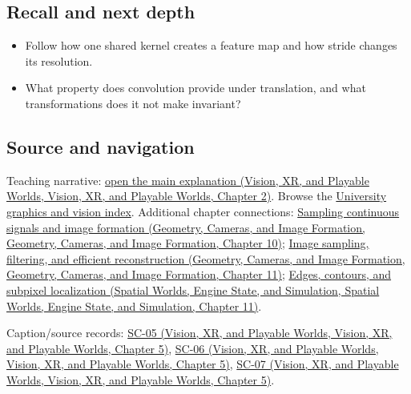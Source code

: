 \subsection{Recall and next depth}\label{appendix-47c51ea026fb-recall-and-next-depth}

\begin{itemize}
\tightlist
\item
  Follow how one shared kernel creates a feature map and how stride changes its resolution.
\item
  What property does convolution provide under translation, and what transformations does it not make invariant?
\end{itemize}

\subsection{Source and navigation}\label{appendix-47c51ea026fb-source-and-navigation}

Teaching narrative: \href{../07-Vision-XR-and-Playable-Worlds/main.pdf\#nameddest=04-visual-computing-ii-ch031-convolutional-models-preserve-image-neighborhoods}{open the main explanation (Vision, XR, and Playable Worlds, Vision, XR, and Playable Worlds, Chapter 2)}. Browse the \hyperref[appendix-a6d556a4ef50-university-graphics-vision-and-photography---independent-series]{University graphics and vision index}. Additional chapter connections: \href{../03-Geometry-Cameras-and-Image-Formation/main.pdf\#nameddest=03-visual-computing-i-ch003-sampling-continuous-signals-and-image-formation}{Sampling continuous signals and image formation (Geometry, Cameras, and Image Formation, Geometry, Cameras, and Image Formation, Chapter 10)}; \href{../03-Geometry-Cameras-and-Image-Formation/main.pdf\#nameddest=03-visual-computing-i-ch004-image-sampling-filtering-and-efficient-reconstruction}{Image sampling, filtering, and efficient reconstruction (Geometry, Cameras, and Image Formation, Geometry, Cameras, and Image Formation, Chapter 11)}; \href{../05-Spatial-Worlds-Engine-State-and-Simulation/main.pdf\#nameddest=04-visual-computing-ii-ch030-edges-contours-and-subpixel-localization}{Edges, contours, and subpixel localization (Spatial Worlds, Engine State, and Simulation, Spatial Worlds, Engine State, and Simulation, Chapter 11)}.

Caption/source records: \href{../07-Vision-XR-and-Playable-Worlds/main.pdf\#nameddest=04-visual-computing-ii-ch036-sc-05---stanford-cs231n-spring-2025-lecture-5-image-classification-with-cnns}{SC-05 (Vision, XR, and Playable Worlds, Vision, XR, and Playable Worlds, Chapter 5)}, \href{../07-Vision-XR-and-Playable-Worlds/main.pdf\#nameddest=04-visual-computing-ii-ch036-sc-06---stanford-cs231n-deep-learning-for-computer-vision-spring-2025-lecture-6-cnn-architectures}{SC-06 (Vision, XR, and Playable Worlds, Vision, XR, and Playable Worlds, Chapter 5)}, \href{../07-Vision-XR-and-Playable-Worlds/main.pdf\#nameddest=04-visual-computing-ii-ch036-sc-07---stanford-cs231n-spring-2025-lecture-7-recurrent-neural-networks}{SC-07 (Vision, XR, and Playable Worlds, Vision, XR, and Playable Worlds, Chapter 5)}.
